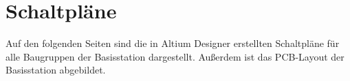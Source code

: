 \section{Schaltpläne}
\label{app:Schematics}
Auf den folgenden Seiten sind die in Altium Designer erstellten Schaltpläne für alle Baugruppen der Basisstation dargestellt. Außerdem ist das \ac{PCB}-Layout der Basisstation abgebildet.


 




